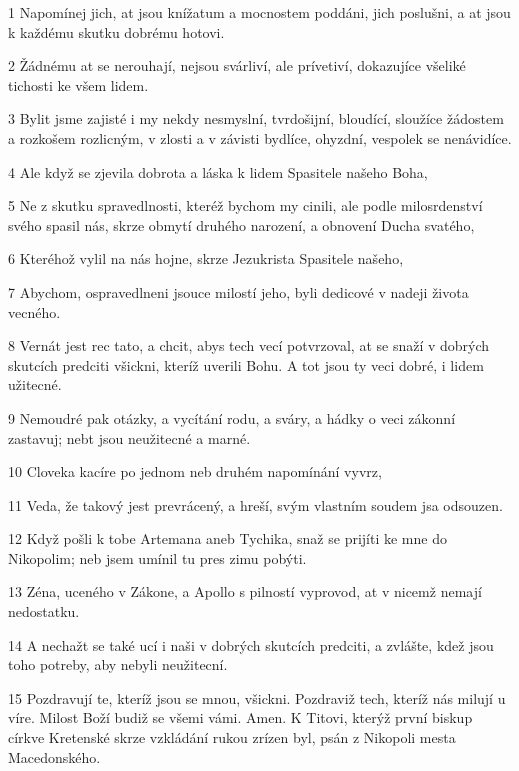 \par 1 Napomínej jich, at jsou knížatum a mocnostem poddáni, jich poslušni, a at jsou k každému skutku dobrému hotovi.
\par 2 Žádnému at se nerouhají, nejsou svárliví, ale prívetiví, dokazujíce všeliké tichosti ke všem lidem.
\par 3 Bylit jsme zajisté i my nekdy nesmyslní, tvrdošijní, bloudící, sloužíce žádostem a rozkošem rozlicným, v zlosti a v závisti bydlíce, ohyzdní, vespolek se nenávidíce.
\par 4 Ale když se zjevila dobrota a láska k lidem Spasitele našeho Boha,
\par 5 Ne z skutku spravedlnosti, kteréž bychom my cinili, ale podle milosrdenství svého spasil nás, skrze obmytí druhého narození, a obnovení Ducha svatého,
\par 6 Kteréhož vylil na nás hojne, skrze Jezukrista Spasitele našeho,
\par 7 Abychom, ospravedlneni jsouce milostí jeho, byli dedicové v nadeji života vecného.
\par 8 Vernát jest rec tato, a chcit, abys tech vecí potvrzoval, at se snaží v dobrých skutcích predciti všickni, kteríž uverili Bohu. A tot jsou ty veci dobré, i lidem užitecné.
\par 9 Nemoudré pak otázky, a vycítání rodu, a sváry, a hádky o veci zákonní zastavuj; nebt jsou neužitecné a marné.
\par 10 Cloveka kacíre po jednom neb druhém napomínání vyvrz,
\par 11 Veda, že takový jest prevrácený, a hreší, svým vlastním soudem jsa odsouzen.
\par 12 Když pošli k tobe Artemana aneb Tychika, snaž se prijíti ke mne do Nikopolim; neb jsem umínil tu pres zimu pobýti.
\par 13 Zéna, uceného v Zákone, a Apollo s pilností vyprovod, at v nicemž nemají nedostatku.
\par 14 A nechažt se také ucí i naši v dobrých skutcích predciti, a zvlášte, kdež jsou toho potreby, aby nebyli neužitecní.
\par 15 Pozdravují te, kteríž jsou se mnou, všickni. Pozdraviž tech, kteríž nás milují u víre. Milost Boží budiž se všemi vámi. Amen. K Titovi, kterýž první biskup církve Kretenské skrze vzkládání rukou zrízen byl, psán z Nikopoli mesta Macedonského.


